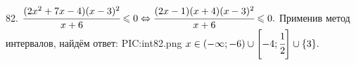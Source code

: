 82. $\cfrac{(2x^2+7x-4)(x-3)^2}{x+6}\leqslant0\Leftrightarrow\cfrac{(2x-1)(x+4)(x-3)^2}{x+6}\leqslant0.$
Применив метод интервалов, найдём ответ:
{{PIC:int82.png}}
$x\in(-\infty;-6)\cup\left[-4;\cfrac{1}{2}\right]\cup\{3\}.$\newpage\noindent
